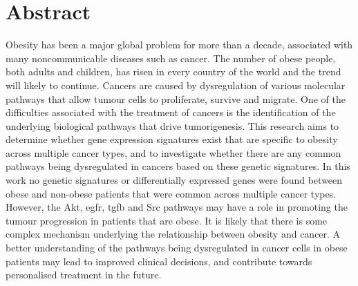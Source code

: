 \vspace*{\fill}

\section*{\centering Abstract}

Obesity has been a major global problem for more than a decade, associated with many noncommunicable diseases such as  cancer.
The number of obese people, both adults and children, has risen in every country of the world and the trend will likely to continue.
Cancers are caused by dysregulation of various molecular pathways that allow tumour cells to proliferate, survive and migrate.
One of the difficulties associated with the treatment of cancers is the identification of the underlying biological pathways that drive tumorigenesis.
This research aims to determine whether gene expression signatures exist  that are specific to obesity across multiple cancer types, and to investigate whether there are any common pathways being dysregulated in cancers based on these genetic signatures.
In this work no genetic signatures or differentially expressed genes were found between obese and non-obese patients that were common across multiple cancer types.
However, the Akt, \gls{egfr}, \gls{tgfb} and Src pathways may have a role in promoting the tumour progression in patients that are obese.
It is likely that there is some complex mechanism underlying the relationship between obesity and cancer.
A better understanding of the pathways being dysregulated in cancer cells in obese patients may lead to improved clinical decisions, and contribute towards personalised treatment in the future.

\vfill
